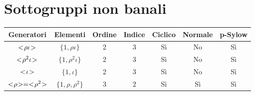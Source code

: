 \section{Sottogruppi non banali}

\begin{center}
	\begin{tabular}{ccccccc}
		\toprule
		Generatori & Elementi & Ordine & Indice & Ciclico & Normale & p-Sylow \\
		\midrule
		$< \negmedspace \rho\iota \negmedspace >$ & $\{1, \rho\iota\}$ & 2 & 3 & Sì & No & Sì \\
		$< \negmedspace \rho^2\iota \negmedspace >$ & $\{1, \rho^2\iota\}$ & 2 & 3 & Sì & No & Sì \\
		$< \negmedspace \iota \negmedspace >$ & $\{1, \iota\}$ & 2 & 3 & Sì & No & Sì \\
		$< \negmedspace \rho \negmedspace > = < \negmedspace \rho^2 \negmedspace >$ & $\{1, \rho, \rho^2\}$ & 3 & 2 & Sì & Sì & Sì \\
		\bottomrule
	\end{tabular}
\end{center}

